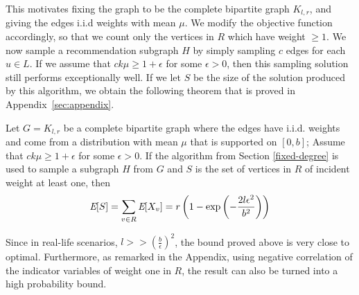 This motivates fixing the graph to be the
complete bipartite graph $K_{l,r}$, and giving the edges i.i.d weights
with mean $\mu$. We modify the objective function accordingly, so that
we count only the vertices in $R$ which have weight $\geq 1$. We now sample a recommendation subgraph
$H$ by simply sampling $c$ edges for each $u\in L$. If we
assume that $ck\mu \geq 1+\epsilon$ for some $\epsilon > 0$, then
this sampling solution still performs exceptionally well. If we let $S$ be the size of the
solution produced by this algorithm, we obtain the following theorem that is
proved in Appendix~\ref{sec:appendix}.

\begin{thm}
Let $G=K_{l,r}$ be a complete bipartite graph where the edges have i.i.d. weights and come from a distribution with mean $\mu$ that is supported on $[0,b]$; Assume that $ck\mu \geq 1+\epsilon$ for some $\epsilon > 0$. If the algorithm from Section \ref{fixed-degree} is used to sample a subgraph $H$ from $G$ and $S$ is the set of vertices in $R$ of incident weight at least one, then
\[ \emph{\text{E}}[S] = \sum_{v\in R} \emph{\text{E}}[X_v] = r\left(1-\exp\left(-\frac{2l\epsilon^2}{b^2}\right)\right) \]
\end{thm}
Since in real-life scenarios, $l >> (\frac{b}{\epsilon})^2$, the bound proved above is very close to optimal. Furthermore, as remarked in the Appendix, using negative correlation of the indicator variables of weight one in $R$, the result can also be turned into a high probability bound.

